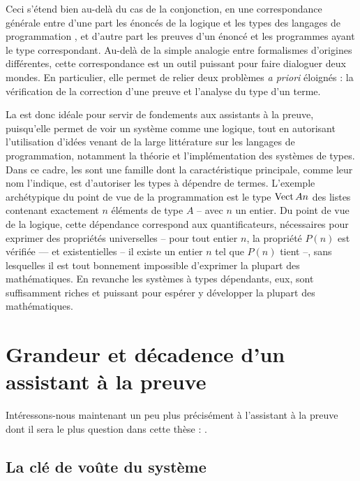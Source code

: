 Ceci s’étend bien au-delà du cas de la conjonction,
en une correspondance générale entre d’une part les énoncés de la logique et les types des langages de programmation , et d’autre part les preuves d’un énoncé et les programmes ayant le type correspondant.
Au-delà de la simple analogie entre formalismes d’origines différentes, cette correspondance est un outil puissant pour faire dialoguer deux mondes.
En particulier, elle permet de relier deux problèmes \textit{a priori} éloignés :
la vérification de la correction d’une preuve et l’analyse du type d’un terme.

La  est donc idéale pour servir de fondements aux
assistants à la preuve, puisqu’elle permet de voir un système
comme une logique, tout en autorisant l’utilisation d’idées venant de
la large littérature sur les langages de programmation, notamment
la théorie et l’implémentation des systèmes de types.
Dans ce cadre, les  sont une famille dont
la caractéristique principale, comme leur nom l’indique, est d’autoriser les
types à dépendre de termes. L’exemple archétypique du point de vue de la 
programmation est le type
$\operatorname{Vect} A n$ des listes contenant exactement $n$ éléments
de type $A$ – avec $n$ un entier.
Du point de vue de la logique, cette
dépendance correspond aux quantificateurs, nécessaires pour exprimer des
propriétés universelles – pour tout entier $n$, la propriété $P(n)$ est
vérifiée — et existentielles – il existe un entier $n$ tel que $P(n)$ tient –,
sans lesquelles il est tout bonnement impossible d’exprimer la plupart des
mathématiques. En revanche les systèmes à types dépendants, eux, sont suffisamment
riches et puissant pour espérer y développer la plupart des mathématiques.

\section{Grandeur et décadence d’un assistant à la preuve}
\label{sec:intro-coq}

Intéressons-nous maintenant un peu plus précisément à l’assistant à la
preuve dont il sera le plus question dans cette thèse : .

\subsection{La clé de voûte du système}

